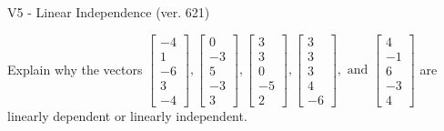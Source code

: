 \begin{exercise}
  \begin{exerciseTitle}V5 - Linear Independence (ver. 621)\end{exerciseTitle}
  \begin{exerciseStatement}
    Explain why the vectors \(\left[\begin{array}{r}
-4 \\
1 \\
-6 \\
3 \\
-4
\end{array}\right] , \left[\begin{array}{r}
0 \\
-3 \\
5 \\
-3 \\
3
\end{array}\right] , \left[\begin{array}{r}
3 \\
3 \\
0 \\
-5 \\
2
\end{array}\right] , \left[\begin{array}{r}
3 \\
3 \\
3 \\
4 \\
-6
\end{array}\right] , \text{ and } \left[\begin{array}{r}
4 \\
-1 \\
6 \\
-3 \\
4
\end{array}\right]\) are linearly dependent or linearly independent.	



\end{exerciseStatement}
\end{exercise}
